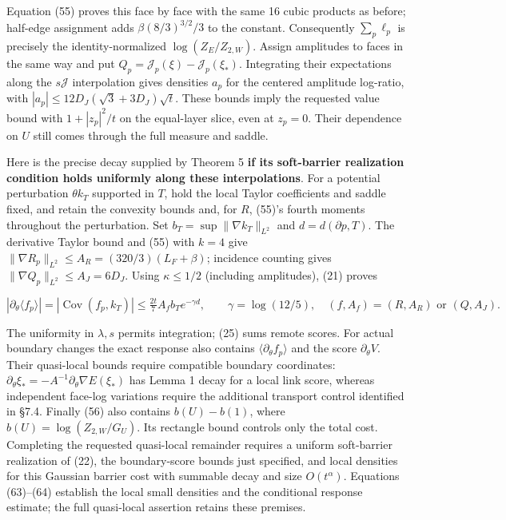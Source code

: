 \documentclass[11pt,a4paper]{article}
\begin{document}
Equation (55) proves this face by face with the same 16 cubic products
as before; half-edge assignment adds \(\beta(8/3)^{3/2}/3\) to the
constant. Consequently \(\sum_p\ell_p\) is precisely the
identity-normalized \(\log(Z_E/Z_{2,W})\). Assign amplitudes to faces in
the same way and put \(Q_p=\mathcal J_p(\xi)-\mathcal J_p(\xi_*)\).
Integrating their expectations along the \(s\mathcal J\) interpolation
gives densities \(a_p\) for the centered amplitude log-ratio, with
\(|a_p|\le12D_J(\sqrt3+3D_J)\sqrt t\). These bounds imply the requested
value bound with \(1+|z_p|^2/t\) on the equal-layer slice, even at
\(z_p=0\). Their dependence on \(U\) still comes through the full
measure and saddle.

Here is the precise decay supplied by Theorem 5 \textbf{if its
soft-barrier realization condition holds uniformly along these
interpolations}. For a potential perturbation \(\theta k_T\) supported
in \(T\), hold the local Taylor coefficients and saddle fixed, and
retain the convexity bounds and, for \(R\), (55)'s fourth moments
throughout the perturbation. Set \(b_T=\sup\|\nabla k_T\|_{L^2}\) and
\(d=d(\partial p,T)\). The derivative Taylor bound and (55) with \(k=4\)
give \(\|\nabla R_p\|_{L^2}\le A_R=(320/3)(L_F+\beta)\); incidence
counting gives \(\|\nabla Q_p\|_{L^2}\le A_J=6D_J\). Using
\(\kappa\le1/2\) (including amplitudes), (21) proves

\[|\partial_\theta\langle f_p\rangle|
=|\operatorname{Cov}(f_p,k_T)|
\le\tfrac{2t}{7}A_f b_T e^{-\gamma d},\qquad
\gamma=\log(12/5),\quad(f,A_f)=(R,A_R)\text{ or }(Q,A_J).\tag{64}\]

The uniformity in \(\lambda,s\) permits integration; (25) sums remote
scores. For actual boundary changes the exact response also contains
\(\langle\partial_\theta f_p\rangle\) and the score
\(\partial_\theta V\). Their quasi-local bounds require compatible
boundary coordinates:
\(\partial_\theta\xi_*=-A^{-1}\partial_\theta\nabla E(\xi_*)\) has Lemma
1 decay for a local link score, whereas independent face-log variations
require the additional transport control identified in §7.4. Finally
(56) also contains \(b(U)-b(1)\), where \(b(U)=\log(Z_{2,W}/G_U)\). Its
rectangle bound controls only the total cost. Completing the requested
quasi-local remainder requires a uniform soft-barrier realization of
(22), the boundary-score bounds just specified, and local densities for
this Gaussian barrier cost with summable decay and size \(O(t^\alpha)\).
Equations (63)--(64) establish the local small densities and the
conditional response estimate; the full quasi-local assertion retains
these premises.
\end{document}
